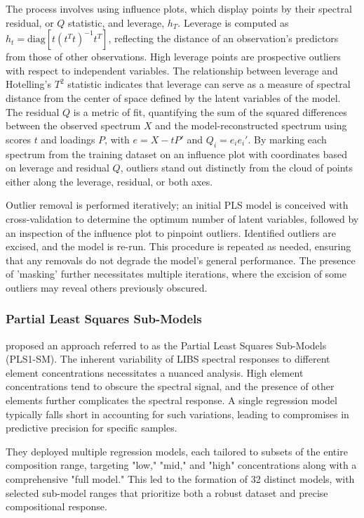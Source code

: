 The process involves using influence plots, which display points by their spectral residual, or $Q$ statistic, and leverage, $h_{T}$. Leverage is computed as $h_{t} = \text{diag}\left[ t(t^{T}t)^{-1}t^{T} \right]$, reflecting the distance of an observation's predictors from those of other observations. High leverage points are prospective outliers with respect to independent variables. The relationship between leverage and Hotelling's $T^{2}$ statistic indicates that leverage can serve as a measure of spectral distance from the center of space defined by the latent variables of the model.
The residual $Q$ is a metric of fit, quantifying the sum of the squared differences between the observed spectrum $X$ and the model-reconstructed spectrum using scores $t$ and loadings $P$, with $e = X - tP'$ and $Q_{i} = e_{i}e_{i}'$. By marking each spectrum from the training dataset on an influence plot with coordinates based on leverage and residual $Q$, outliers stand out distinctly from the cloud of points either along the leverage, residual, or both axes.

Outlier removal is performed iteratively; an initial PLS model is conceived with cross-validation to determine the optimum number of latent variables, followed by an inspection of the influence plot to pinpoint outliers. Identified outliers are excised, and the model is re-run. This procedure is repeated as needed, ensuring that any removals do not degrade the model's general performance. The presence of 'masking' further necessitates multiple iterations, where the excision of some outliers may reveal others previously obscured.


\subsubsection{Partial Least Squares Sub-Models}\label{sec:pls_submodels}

\citet{andersonImprovedAccuracyQuantitative2017} proposed an approach referred to as the Partial Least Squares Sub-Models (PLS1-SM).
The inherent variability of LIBS spectral responses to different element concentrations necessitates a nuanced analysis. High element concentrations tend to obscure the spectral signal, and the presence of other elements further complicates the spectral response. A single regression model typically falls short in accounting for such variations, leading to compromises in predictive precision for specific samples.

They deployed multiple regression models, each tailored to subsets of the entire composition range, targeting "low," "mid," and "high" concentrations along with a comprehensive "full model." This led to the formation of 32 distinct models, with selected sub-model ranges that prioritize both a robust dataset and precise compositional response.

